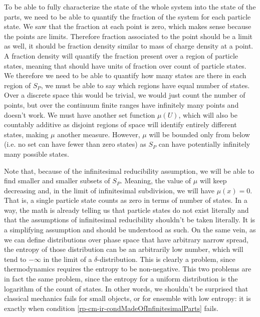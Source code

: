 To be able to fully characterize the state of the whole system into the state of the parts, we need to be able to quantify the fraction of the system for each particle state. We saw that the fraction at each point is zero, which makes sense because the points are limits. Therefore fraction associated to the point should be a limit as well, it should be fraction density similar to mass of charge density at a point. A fraction density will quantify the fraction present over a region of particle states, meaning that should have units of fraction over count of particle states. We therefore we need to be able to quantify how many states are there in each region of $S_P$, we must be able to say which regions have equal number of states. Over a discrete space this would be trivial, we would just count the number of points, but over the continuum finite ranges have infinitely many points and doesn't work. We must have another set function $\mu(U)$, which will also be countably additive as disjoint regions of space will identify entirely different states, making $\mu$ another measure. However, $\mu$ will be bounded only from below (i.e. no set can have fewer than zero states) as $S_P$ can have potentially infinitely many possible states.

Note that, because of the infinitesimal reducibility assumption, we will be able to find smaller and smaller subsets of $S_P$. Meaning, the value of $\mu$ will keep decreasing and, in the limit of infinitesimal subdivision, we will have $\mu({x})=0$. That is, a single particle state counts as zero in terms of number of states. In a way, the math is already telling us that particle states do not exist literally and that the assumptions of infinitesimal reducibility shouldn't be taken literally. It is a simplifying assumption and should be understood as such. On the same vein, as we can define distributions over phase space that have arbitrary narrow spread, the entropy of those distribution can be an arbitrarily low number, which will tend to $-\infty$ in the limit of a $\delta$-distribution. This is clearly a problem, since thermodynamics requires the entropy to be non-negative. This two problems are in fact the same problem, since the entropy for a uniform distribution is the logarithm of the count of states. In other words, we shouldn't be surprised that classical mechanics fails for small objects, or for ensemble with low entropy: it is exactly when condition \ref{rp-cm-ir-condMadeOfInfinitesimalParts} fails.

